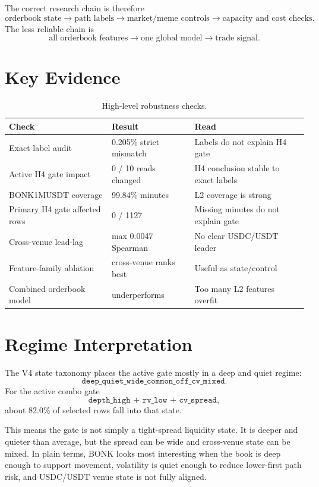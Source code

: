 \documentclass[11pt]{article}
\begin{document}
The correct research chain is therefore
\[
  \text{orderbook state}
  \rightarrow
  \text{path labels}
  \rightarrow
  \text{market/meme controls}
  \rightarrow
  \text{capacity and cost checks}.
\]
The less reliable chain is
\[
  \text{all orderbook features}
  \rightarrow
  \text{one global model}
  \rightarrow
  \text{trade signal}.
\]

\section{Key Evidence}

\begin{table}[h]
\centering
\begin{tabular}{lll}
\toprule
Check & Result & Read \\
\midrule
Exact label audit & 0.205\% strict mismatch & Labels do not explain H4 gate \\
Active H4 gate impact & 0 / 10 reads changed & H4 conclusion stable to exact labels \\
BONK1MUSDT coverage & 99.84\% minutes & L2 coverage is strong \\
Primary H4 gate affected rows & 0 / 1127 & Missing minutes do not explain gate \\
Cross-venue lead-lag & max 0.0047 Spearman & No clear USDC/USDT leader \\
Feature-family ablation & cross-venue ranks best & Useful as state/control \\
Combined orderbook model & underperforms & Too many L2 features overfit \\
\bottomrule
\end{tabular}
\caption{High-level robustness checks.}
\end{table}

\section{Regime Interpretation}

The V4 state taxonomy places the active gate mostly in a deep and quiet regime:
\[
  \texttt{deep\_quiet\_wide\_common\_off\_cv\_mixed}.
\]
For the active combo gate
\[
  \texttt{depth\_high + rv\_low + cv\_spread},
\]
about 82.0\% of selected rows fall into that state.

This means the gate is not simply a tight-spread liquidity state. It is deeper and quieter than average, but the spread can be wide and cross-venue state can be mixed. In plain terms, BONK looks most interesting when the book is deep enough to support movement, volatility is quiet enough to reduce lower-first path risk, and USDC/USDT venue state is not fully aligned.
\end{document}
